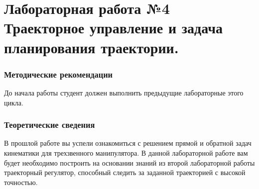 \documentclass[12pt,a4paper,openany]{extarticle}
\begin{document}
\part*{Лабораторная работа №4\\ Траекторное управление и задача планирования траектории.}
\section{Методические рекомендации}
\hspace*{\parindent}До начала работы студент должен выполнить предыдущие лабораторные этого цикла.

\section{Теоретические сведения}
\hspace*{\parindent}В прошлой работе вы успели ознакомиться с решением прямой и обратной задач кинематики для трехзвенного манипулятора. В данной лабораторной работе вам будет необходимо построить на основании знаний из второй лабораторной работы траекторный регулятор, способный следить за заданной траекторией с высокой точностью.

\end{document}
